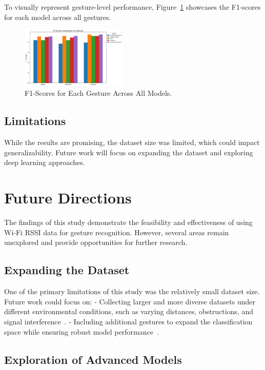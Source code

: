 \documentclass[10pt,twocolumn,letterpaper]{article}
\begin{document}
To visually represent gesture-level performance, Figure~\ref{fig:f1_per_gesture} showcases the F1-scores for each model across all gestures.

\begin{figure}[h]
  \centering
  \includegraphics[width=0.45\textwidth]{figures/f1_per_gesture_chart.png}
  \caption{F1-Scores for Each Gesture Across All Models.}
  \label{fig:f1_per_gesture}
\end{figure}

\subsection{Limitations}

While the results are promising, the dataset size was limited, which could impact generalizability. Future work will focus on expanding the dataset and exploring deep learning approaches.



\section{Future Directions}

The findings of this study demonstrate the feasibility and effectiveness of using Wi-Fi RSSI data for gesture recognition. However, several areas remain unexplored and provide opportunities for further research.

\subsection{Expanding the Dataset}

One of the primary limitations of this study was the relatively small dataset size. Future work could focus on:
- Collecting larger and more diverse datasets under different environmental conditions, such as varying distances, obstructions, and signal interference~\cite{wang2017wifi}.
- Including additional gestures to expand the classification space while ensuring robust model performance~\cite{haseeb2020wisture}.

\subsection{Exploration of Advanced Models}
\end{document}

